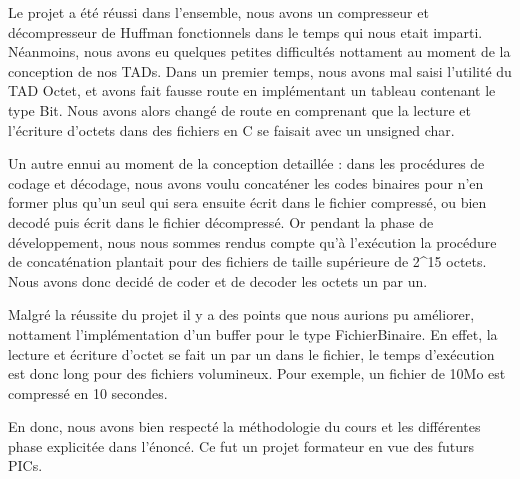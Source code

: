 Le projet a \'{e}t\'{e} réussi dans l'ensemble, nous avons un compresseur et décompresseur de Huffman fonctionnels dans le temps qui nous etait imparti. \\

N\'{e}anmoins, nous avons eu quelques petites difficultés nottament au moment de la conception de nos TADs. Dans un premier temps, nous avons mal saisi l'utilité du TAD Octet, et avons fait fausse route en impl\'{e}mentant un tableau contenant le type Bit. Nous avons alors chang\'{e} de route en comprenant que la lecture et l'\'{e}criture d'octets dans des fichiers en C se faisait avec un unsigned char.

Un autre ennui au moment de la conception detaill\'{e}e : dans les proc\'{e}dures de codage et d\'{e}codage, nous avons voulu concat\'{e}ner les codes binaires pour n'en former plus qu'un seul qui sera ensuite \'{e}crit dans le fichier compress\'{e}, ou bien decodé puis \'{e}crit dans le fichier d\'{e}compress\'{e}. Or pendant la phase de d\'{e}veloppement, nous nous sommes rendus compte qu'à l'ex\'{e}cution la proc\'{e}dure de concat\'{e}nation plantait pour des fichiers de taille sup\'{e}rieure de 2\^{}15 octets. Nous avons donc decid\'{e} de coder et de decoder les octets un par un.

Malgr\'{e} la r\'{e}ussite du projet il y a des points que nous aurions pu am\'{e}liorer, nottament l'impl\'{e}mentation d'un buffer pour le type FichierBinaire. En effet, la lecture et \'{e}criture d'octet se fait un par un dans le fichier, le temps d'ex\'{e}cution est donc long pour des fichiers volumineux. Pour exemple, un fichier de 10Mo est compress\'{e} en 10 secondes.

En donc, nous avons bien respect\'{e} la m\'{e}thodologie du cours et les diff\'{e}rentes phase explicit\'{e}e dans l'\'{e}nonc\'{e}. Ce fut un projet formateur en vue des futurs PICs.
